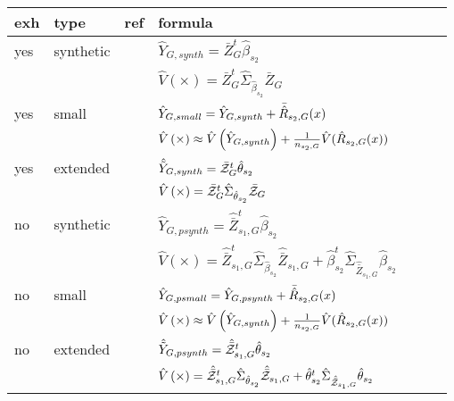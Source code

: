 \begin{table}
    \centering
\begin{tabular}{l l l l l r l}
	 exh 	&  type	&  ref & formula\\ \toprule
			
     yes 	&  synthetic 	& \cite[eq. 18]{Man13a} & $\hat{Y}_{G,synth} = \bar{Z}^t_G\hat{\beta}_{s_2}$ \\
        &    	& \cite[eq. 19]{Man13a} & $\hat{V}\left(\times\right) = \bar{Z}^t_G \hat{\Sigma}_{ \hat{\beta}_{s_2}} \bar{Z}_G$ \\
			
\lightrule
     yes 	&  small 	& \cite[eq. 20]{Man13a} & $\hat{Y}_{G,small} = \hat{Y}_{G,synth} +\bar{\hat{R}}_{s_2,G}(x)$ \\
            &   	& \cite[eq. 21]{Man13a} & $\hat{V}\left(\times\right) \approx \hat{V}\left(\hat{Y}_{G,synth}\right) + \frac{1}{n_{s_2,G}}\hat{V}(\hat{R}_{s_2,G}(x)) $ \\ 
\lightrule
     yes 	&  extended 	& \cite[eq. 31]{Man13a} & $\hat{\tilde{Y}}_{G,synth} = \bar{\mathcal{Z}}^t_G\hat{\theta}_{s_2}$ \\
    &    	& \cite[eq. 33]{Man13a} & $\hat{V}\left(\times\right) = \bar{\mathcal{Z}}^t_G \hat{\Sigma}_{ \hat{\theta}_{s_2}} \bar{\mathcal{Z}}_G$ \\
\strongrule
			

     no 	&  synthetic 	& \cite[eq. 22]{Man13a} & $\hat{Y}_{G,psynth} = \hat{\bar{Z}}^t_{s_1,G}\hat{\beta}_{s_2}$ \\
        &    	& \cite[eq. 23]{Man13a} & $\hat{V}\left(\times\right) = \hat{\bar{Z}}^t_{s_1,G} \hat{\Sigma}_{ \hat{\beta}_{s_2}} \hat{\bar{Z}}_{s_1,G} + \hat{\beta}^t_{s_2} \hat{\Sigma}_{ \hat{\bar{Z}}_{s_1,G}  } \hat{\beta}_{s_2}$ \\
			
\lightrule
     no 	&  small 	& \cite[eq. 25]{Man13a} & $\hat{Y}_{G,psmall} = \hat{Y}_{G,psynth} + \bar{\hat{R}}_{s_2,G}(x)$ \\
            &      	& \cite[eq. 26]{Man13a} & $\hat{V}\left(\times\right) \approx \hat{V}\left(\hat{Y}_{G,synth}\right) + \frac{1}{n_{s_2,G}}\hat{V}(\hat{R}_{s_2,G}(x))$ \\
\lightrule
     no 	&  extended 	& \cite[eq. 35]{Man13a} & $\hat{\tilde{Y}}_{G,psynth} = \hat{\bar{\mathcal{Z}}}^t_{s_1,G}\hat{\theta}_{s_2}$ \\
    &    	&  \cite[eq. 36]{Man13a} & $\hat{V}\left(\times\right) = \hat{\bar{\mathcal{Z}}}^t_{s_1,G} \hat{\Sigma}_{ \hat{\theta}_{s_2}} \hat{\bar{\mathcal{Z}}}_{s_1,G} + \hat{\theta}^t_{s_2} \hat{\Sigma}_{ \hat{\bar{\mathcal{Z}}}_{s_1,G}  } \hat{\theta}_{s_2}$ \\
			

\end{tabular}
\end{table}
